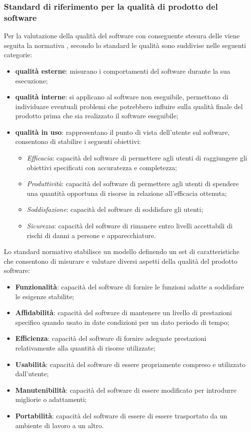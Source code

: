 \subsubsection{Standard di riferimento per la qualità di prodotto del software}
Per la valutazione della qualità del software con conseguente stesura delle  viene seguita la normativa , secondo lo standard le qualità sono suddivise nelle seguenti categorie:
\begin{itemize}
    \item \textbf{qualità esterne}: misurano i comportamenti del software durante la sua esecuzione;
    \item \textbf{qualità interne}: si applicano al software non eseguibile, permettono di individuare eventuali problemi che potrebbero influire sulla qualità finale del prodotto prima che sia realizzato il software eseguibile;
    \item \textbf{qualità in uso}: rappresentano il punto di vista dell'utente sul software, consentono di stabilire i seguenti obiettivi:
    \begin{itemize}
        \item \textit{Efficacia}: capacità del software di permettere agli utenti di raggiungere gli obiettivi specificati con accuratezza e completezza;
        \item \textit{Produttività}: capacità del software di permettere agli utenti di spendere una quantità opportuna di risorse in relazione all'efficacia ottenuta;
        \item \textit{Soddisfazione}: capacità del software di soddisfare gli utenti;
        \item \textit{Sicurezza}: capacità del software di rimanere entro livelli accettabili di rischi di danni a persone e apparecchiature.
    \end{itemize}
\end{itemize}
Lo standard normativo stabilisce un modello definendo un set di caratteristiche che consentono di misurare e valutare diversi aspetti della qualità del prodotto software:
\begin{itemize}
    \item \textbf{Funzionalità}: capacità del software di fornire le funzioni adatte a soddisfare le esigenze stabilite;
    \item \textbf{Affidabilità}: capacità del software di mantenere un livello di prestazioni specifico quando usato in date condizioni per un dato periodo di tempo;
    \item \textbf{Efficienza}: capacità del software di fornire adeguate prestazioni relativamente alla quantità di risorse utilizzate;
    \item \textbf{Usabilità}: capacità del software di essere propriamente compreso e utilizzato dall'utente;
    \item \textbf{Manutenibilità}: capacità del software di essere modificato per introdurre migliorie o adattamenti;
    \item \textbf{Portabilità}: capacità del software di essere di essere trasportato da un ambiente di lavoro a un altro.
\end{itemize}
